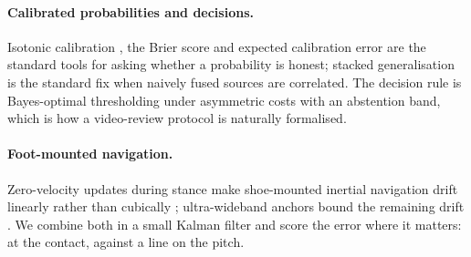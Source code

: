 \paragraph{Calibrated probabilities and decisions.} Isotonic calibration
\cite{zadrozny2002transforming}, the Brier score \cite{brier1950verification}
and expected calibration error are the standard tools for asking whether a
probability is honest; stacked generalisation \cite{wolpert1992stacked} is the
standard fix when naively fused sources are correlated. The decision rule is
Bayes-optimal thresholding under asymmetric costs with an abstention band,
which is how a video-review protocol is naturally formalised.

\paragraph{Foot-mounted navigation.} Zero-velocity updates during stance make
shoe-mounted inertial navigation drift linearly rather than cubically
\cite{foxlin2005pedestrian, skog2010zero}; ultra-wideband anchors bound the
remaining drift \cite{alarifi2016ultra}. We combine both in a small Kalman
filter \cite{kalman1960new} and score the error where it matters: at the
contact, against a line on the pitch.
